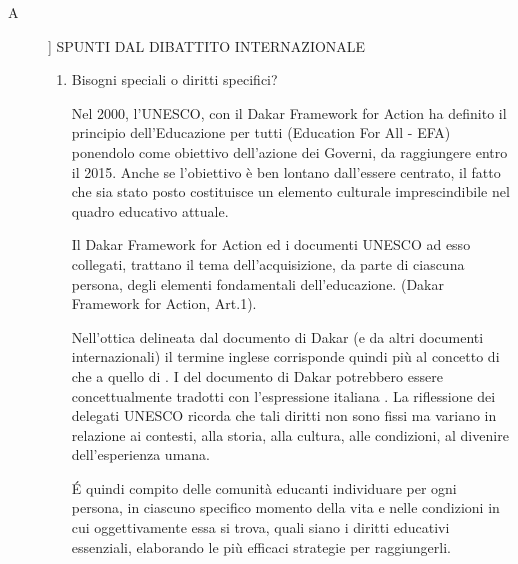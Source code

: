 \begin{description}
	\item[A]] SPUNTI DAL DIBATTITO INTERNAZIONALE
	\begin{enumerate}
		\item Bisogni speciali o diritti specifici?
		
		Nel 2000, l'UNESCO, con il {\foreignlanguage{english} Dakar Framework for Action} ha definito il principio dell'Educazione per tutti {\foreignlanguage{english}	(Education For All - EFA)}
	 ponendolo come obiettivo dell'azione dei Governi, da raggiungere entro il
		2015. Anche se l'obiettivo è ben lontano dall'essere centrato, il fatto che sia stato posto costituisce un
		elemento culturale imprescindibile nel quadro educativo attuale.
		
		Il {\foreignlanguage{english} Dakar Framework for Action} ed i documenti UNESCO ad esso collegati, trattano il tema
		dell'acquisizione, da parte di ciascuna persona, degli elementi fondamentali dell'educazione.  ({\foreignlanguage{english} Dakar Framework for Action}, Art.1).
	
		Nell'ottica delineata dal documento di Dakar (e da altri documenti internazionali) il termine inglese
			 corrisponde quindi più al concetto di  che a quello di . I  del documento di Dakar potrebbero essere concettualmente tradotti con l'espressione italiana . La riflessione dei delegati UNESCO ricorda che tali diritti non sono fissi
		ma variano in relazione ai contesti, alla storia, alla cultura, alle condizioni, al divenire dell'esperienza
		umana.
	
		\'{E} quindi compito delle comunità educanti individuare per ogni persona, in ciascuno specifico
		momento della vita e nelle condizioni in cui oggettivamente essa si trova, quali siano i diritti educativi
		essenziali, elaborando le più efficaci strategie per raggiungerli.
		

\end{enumerate}
\end{description}
